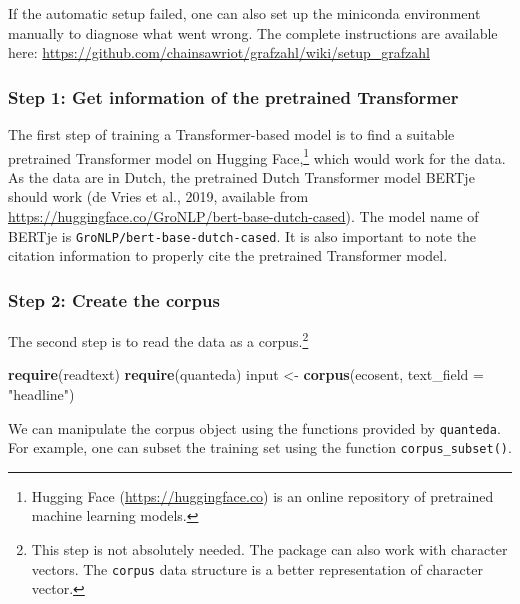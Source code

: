 \documentclass[
  english,
  man,floatsintext]{apa7}
\newenvironment{Shaded}{\begin{snugshade}}{\end{snugshade}}
\newcommand{\DataTypeTok}[1]{\textcolor[rgb]{0.13,0.29,0.53}{#1}}
\newcommand{\KeywordTok}[1]{\textcolor[rgb]{0.13,0.29,0.53}{\textbf{#1}}}
\newcommand{\NormalTok}[1]{#1}
\newcommand{\StringTok}[1]{\textcolor[rgb]{0.31,0.60,0.02}{#1}}
\begin{document}
If the automatic setup failed, one can also set up the miniconda environment manually to diagnose what went wrong. The complete instructions are available here: \url{https://github.com/chainsawriot/grafzahl/wiki/setup_grafzahl}

\hypertarget{step-1-get-information-of-the-pretrained-transformer}{%
\subsubsection{Step 1: Get information of the pretrained Transformer}\label{step-1-get-information-of-the-pretrained-transformer}}

The first step of training a Transformer-based model is to find a suitable pretrained Transformer model on Hugging Face,\footnote{Hugging Face (\url{https://huggingface.co}) is an online repository of pretrained machine learning models.} which would work for the data. As the data are in Dutch, the pretrained Dutch Transformer model BERTje should work (de Vries et al., 2019, available from \url{https://huggingface.co/GroNLP/bert-base-dutch-cased}). The model name of BERTje is \texttt{GroNLP/bert-base-dutch-cased}. It is also important to note the citation information to properly cite the pretrained Transformer model.

\hypertarget{step-2-create-the-corpus}{%
\subsubsection{Step 2: Create the corpus}\label{step-2-create-the-corpus}}

The second step is to read the data as a corpus.\footnote{This step is not absolutely needed. The package can also work with character vectors. The \texttt{corpus} data structure is a better representation of character vector.}

\begin{Shaded}
\begin{Highlighting}[]
\KeywordTok{require}\NormalTok{(readtext)}
\KeywordTok{require}\NormalTok{(quanteda)}
\NormalTok{input \textless{}{-}}\StringTok{ }\KeywordTok{corpus}\NormalTok{(ecosent, }\DataTypeTok{text\_field =} \StringTok{"headline"}\NormalTok{)}
\end{Highlighting}
\end{Shaded}

We can manipulate the corpus object using the functions provided by \texttt{quanteda}. For example, one can subset the training set using the function \texttt{corpus\_subset()}.
\end{document}
